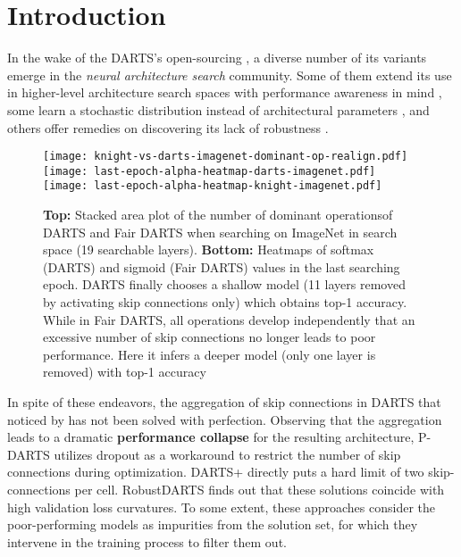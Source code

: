 \documentclass[runningheads]{llncs}
\begin{document}
\section{Introduction}\label{sec:intro}
In the wake of the DARTS's open-sourcing \cite{liu2018darts}, a diverse number of its variants emerge in the \emph{neural architecture search} community. Some of them extend its use in higher-level architecture search spaces with performance awareness in mind \cite{cai2018proxylessnas,wu2018fbnet}, some learn a stochastic distribution instead of architectural parameters \cite{wu2018fbnet,xie2018snas,zheng2019multinomial,dong2019one,dong2019searching}, and others offer remedies on discovering its lack of robustness \cite{nayman2019xnas,chen2019progressive,liang2019darts,li2019stacnas,zela2020understanding}.

\begin{figure}[ht]
	\centering
	\texttt{[image: knight-vs-darts-imagenet-dominant-op-realign.pdf]}
\texttt{[image: last-epoch-alpha-heatmap-darts-imagenet.pdf]}
	\texttt{[image: last-epoch-alpha-heatmap-knight-imagenet.pdf]}
	\caption{\textbf{Top:} Stacked area plot of the number of dominant operations\protect\footnotemark  of DARTS and Fair DARTS when searching on ImageNet in search space  (19 searchable layers). \textbf{Bottom:} Heatmaps of softmax (DARTS) and sigmoid (Fair DARTS) values in the last searching epoch. DARTS finally chooses a shallow model (11 layers removed by activating skip connections only) which obtains  top-1 accuracy. While in Fair DARTS, all operations develop independently that an excessive number of skip connections no longer leads to poor performance. Here it infers a deeper model (only one layer is removed) with  top-1 accuracy} \label{fig:num-skip-imagenet}
\end{figure}

In spite of these endeavors, the aggregation of skip connections in DARTS that noticed by  \cite{chen2019progressive,liang2019darts,bi2019stabilizing,zela2020understanding} has not been solved with perfection. Observing that the aggregation leads to a dramatic \textbf{performance collapse} for the resulting architecture, P-DARTS \cite{chen2019progressive} utilizes dropout as a workaround to restrict the number of skip connections during optimization. DARTS+ \cite{liang2019darts} directly puts a hard limit of two skip-connections per cell. RobustDARTS \cite{zela2020understanding} finds out that these solutions coincide with high validation loss curvatures. To some extent, these approaches consider the poor-performing models as impurities from the solution set, for which they intervene in the training process to filter them out. 
\end{document}
